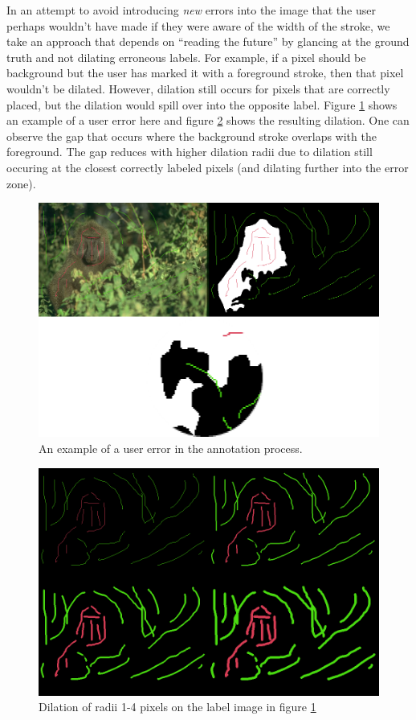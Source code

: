 \documentclass[12pt,a4paper,notitlepage]{article}
\begin{document}
In an attempt to avoid introducing \textit{new} errors into the image that the user perhaps wouldn't have made if they were aware of the width of the stroke, we take an approach that depends on ``reading the future'' by glancing at the ground truth and not dilating erroneous labels. For example, if a pixel should be background but the user has marked it with a foreground stroke, then that pixel wouldn't be dilated. However, dilation still occurs for pixels that are correctly placed, but the dilation would spill over into the opposite label. Figure \ref{fig:dilation_error_example} shows an example of a user error here and figure \ref{fig:dilate_example_all} shows the resulting dilation. One can observe the gap that occurs where the background stroke overlaps with the foreground. The gap reduces with higher dilation radii due to dilation still occuring at the closest correctly labeled pixels (and dilating further into the error zone).

\begin{figure}[h]
	\includegraphics[width=\linewidth]{dilation_error_example}
	\caption{An example of a user error in the annotation process.}
	\label{fig:dilation_error_example}
\end{figure}

\begin{figure}[h]
	\includegraphics[width=\linewidth]{dilate_example_all}
	\caption{Dilation of radii 1-4 pixels on the label image in figure \ref{fig:dilation_error_example}}
	\label{fig:dilate_example_all}
\end{figure}
\end{document}
